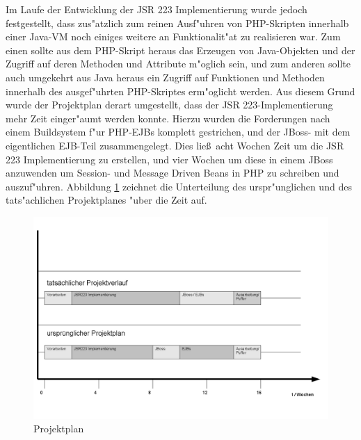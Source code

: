 Im Laufe der Entwicklung der JSR 223 Implementierung wurde jedoch festgestellt, dass zus"atzlich zum reinen Ausf"uhren von PHP-Skripten
innerhalb einer Java-VM noch einiges weitere an Funktionalit"at zu realisieren war. Zum einen sollte aus dem PHP-Skript heraus das Erzeugen
von Java-Objekten und der Zugriff auf deren Methoden und Attribute m"oglich sein, und zum anderen sollte auch umgekehrt aus Java heraus ein
Zugriff auf Funktionen und Methoden innerhalb des ausgef"uhrten PHP-Skriptes erm"oglicht werden.
Aus diesem Grund wurde der Projektplan derart umgestellt, dass der JSR 223-Implementierung mehr Zeit einger"aumt werden konnte. 
Hierzu wurden die Forderungen nach
einem Buildsystem f"ur PHP-EJBs komplett gestrichen, und der JBoss- mit dem eigentlichen EJB-Teil zusammengelegt. Dies lie\ss\ acht Wochen
Zeit um die JSR 223 Implementierung zu erstellen, und vier Wochen um diese in einem JBoss anzuwenden um Session- und Message Driven
Beans in PHP zu schreiben und auszuf"uhren. 
Abbildung \ref{fig:plan} zeichnet die Unterteilung des urspr"unglichen und des tats"achlichen Projektplanes "uber die Zeit auf.

\begin{figure}[h]
\includegraphics[width=\textwidth]{javanscripts/img/plan.png}
\caption{Projektplan}
\label{fig:plan}
\end{figure}



